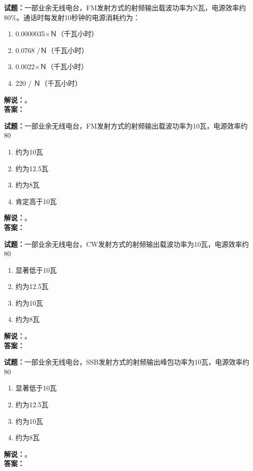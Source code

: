 \documentclass{ctexbook}
\begin{document}
\bigskip

\noindent\textbf{试题：}一部业余无线电台，FM发射方式的射频输出载波功率为N瓦，电源效率约80\%。通话时每发射10秒钟的电源消耗约为：
\begin{enumerate}[leftmargin=3em]
  \item 0.0000035×Ｎ（千瓦小时）
  \item 0.0768 /Ｎ（千瓦小时）
  \item 0.0022×Ｎ（千瓦小时）
  \item 220 / Ｎ（千瓦小时）
\end{enumerate}
\noindent\textbf{解说：}\textbf{}。\\\noindent\textbf{答案：}

\bigskip

\noindent\textbf{试题：}一部业余无线电台，FM发射方式的射频输出载波功率为10瓦，电源效率约80%
\begin{enumerate}[leftmargin=3em]
  \item 约为10瓦
  \item 约为12.5瓦
  \item 约为8瓦
  \item 肯定高于10瓦
\end{enumerate}
\noindent\textbf{解说：}\textbf{}。\\\noindent\textbf{答案：}

\bigskip

\noindent\textbf{试题：}一部业余无线电台，CW发射方式的射频输出载波功率为10瓦，电源效率约80%
\begin{enumerate}[leftmargin=3em]
  \item 显著低于10瓦
  \item 约为12.5瓦
  \item 约为10瓦
  \item 约为8瓦
\end{enumerate}
\noindent\textbf{解说：}\textbf{}。\\\noindent\textbf{答案：}

\bigskip

\noindent\textbf{试题：}一部业余无线电台，SSB发射方式的射频输出峰包功率为10瓦，电源效率约80%
\begin{enumerate}[leftmargin=3em]
  \item 显著低于10瓦
  \item 约为12.5瓦
  \item 约为10瓦
  \item 约为8瓦
\end{enumerate}
\noindent\textbf{解说：}\textbf{}。\\\noindent\textbf{答案：}
\end{document}
